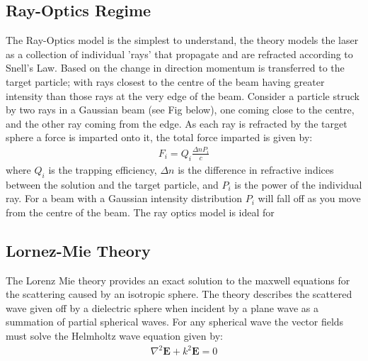 \subsection{Ray-Optics Regime}

The Ray-Optics model is the simplest to understand, the theory models 
the laser as a collection of individual 'rays' that propagate and are 
refracted according to Snell's Law. Based on the change in direction 
momentum is transferred to the target particle; with rays closest to 
the centre of the beam having greater intensity than those rays at 
the very edge of the beam. Consider a particle struck by two rays in 
a Gaussian beam (see Fig below), one coming close to the centre, and 
the other ray coming from the edge. As each ray is refracted by the 
target sphere a force is imparted onto it, the total force imparted 
is given by:
\begin{align}
	F_i = Q_i\frac{\Delta n P_i}{c}
\end{align}
where $Q_i$ is the trapping efficiency, $\Delta n$ is the difference
in refractive indices between the solution and the target particle,
and $P_i$ is the power of the individual ray. For a beam with a
Gaussian intensity distribution $P_i$ will fall off as you move from
the centre of the beam.  The ray optics model is ideal for


\subsection{Lornez-Mie Theory}

The Lorenz Mie theory provides an exact solution to the maxwell equations 
for the scattering caused by an isotropic sphere. The theory describes the 
scattered wave given off by a dielectric sphere when incident by a plane 
wave as a summation of partial spherical waves. For any spherical wave the 
vector fields must solve the Helmholtz wave equation given by:
\begin{align}
	\nabla^2\mathbf{E} +k^2\mathbf{E} = 0
\end{align} 

